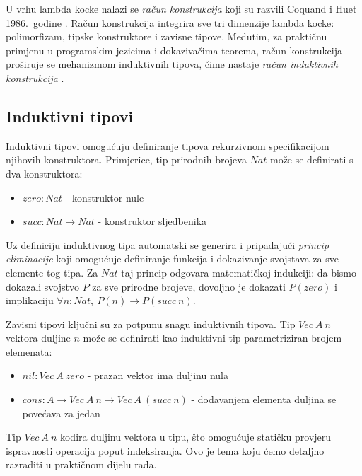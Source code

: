 \documentclass[diplomskirad,upload]{fer}
\begin{document}
U vrhu lambda kocke nalazi se \emph{račun konstrukcija}  koji su razvili Coquand i Huet 1986.\ godine
\cite{coquand:inria-00076024}. Račun konstrukcija integrira sve tri dimenzije lambda
kocke: polimorfizam, tipske konstruktore i zavisne tipove. Međutim, za
praktičnu primjenu u programskim jezicima i dokazivačima teorema, račun
konstrukcija proširuje se mehanizmom induktivnih tipova, čime nastaje
\emph{račun induktivnih konstrukcija}  \cite{10.1007/3-540-52335-9_47}.

\subsection{Induktivni tipovi}

Induktivni tipovi omogućuju definiranje tipova rekurzivnom specifikacijom
njihovih konstruktora. Primjerice, tip prirodnih brojeva \(Nat\) može se
definirati s dva konstruktora:

\begin{itemize}
    \item \(zero : Nat\) - konstruktor nule
    \item \(succ : Nat \to Nat\) - konstruktor sljedbenika
\end{itemize}

Uz definiciju induktivnog tipa automatski se generira i pripadajući \emph{princip
eliminacije}  koji omogućuje definiranje funkcija i
dokazivanje svojstava za sve elemente tog tipa. Za \(Nat\) taj princip
odgovara matematičkoj indukciji: da bismo dokazali svojstvo \(P\) za sve
prirodne brojeve, dovoljno je dokazati \(P(zero)\) i implikaciju \(\forall n :
Nat,\ P(n) \to P(succ\ n)\).

Zavisni tipovi ključni su za potpunu snagu induktivnih tipova. Tip \(Vec\ A\ n\)
vektora duljine \(n\) može se definirati kao induktivni tip parametriziran
brojem elemenata:

\begin{itemize}
    \item \(nil : Vec\ A\ zero\) - prazan vektor ima duljinu nula
    \item \(cons : A \to Vec\ A\ n \to Vec\ A\ (succ\ n)\) - dodavanjem
    elementa duljina se povećava za jedan
\end{itemize}

Tip \(Vec\ A\ n\) kodira duljinu vektora u tipu, što omogućuje statičku
provjeru ispravnosti operacija poput indeksiranja. Ovo je tema koju ćemo
detaljno razraditi u praktičnom dijelu rada.
\end{document}

